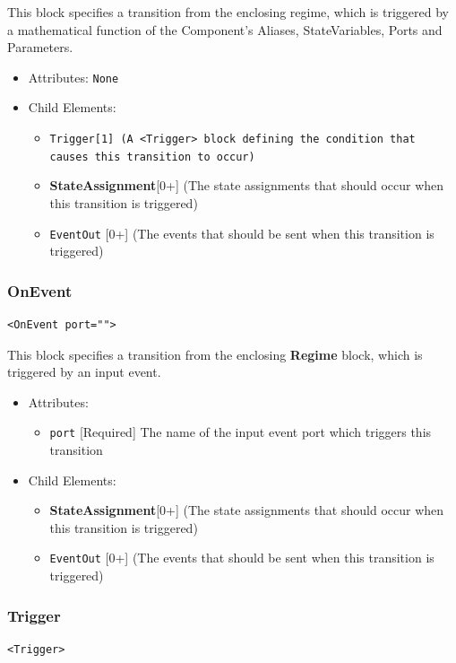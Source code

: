 \documentclass{article}
\newcommand{\StateAssignment}{{\bf{StateAssignment}}\xspace}
\newcommand{\Regime}{{\bf{Regime}}\xspace}
\newcommand{\Trigger}{\tt{Trigger}}
\begin{document}
This block specifies a transition from the enclosing regime, which is triggered
by a mathematical function of the Component's Aliases, StateVariables, Ports and
Parameters.

\begin{itemize}
\item Attributes: \texttt{None}

\item Child Elements:
%
\begin{itemize}
\item \Trigger {[}1{]} (A \verb|<Trigger>| block defining the condition that
causes this transition to occur)
\item \StateAssignment {[}0+{]} (The state assignments that should occur when
this transition is triggered)
\item {\tt EventOut} {[}0+{]} (The events that should be sent when this
transition is triggered)
\end{itemize}
\end{itemize}

\subsubsection{OnEvent}
%
\begin{lstlisting}
<OnEvent port="">
\end{lstlisting}

This block specifies a transition from the enclosing \Regime block, which is
triggered
by an input event.

\begin{itemize}
\item Attributes:
%
\begin{itemize}
\item \verb|port| {[}Required{]} The name of the input event port which triggers
this
transition
\end{itemize}

\item Child Elements:
%
\begin{itemize}
\item \StateAssignment {[}0+{]} (The state assignments that should occur when
this transition is triggered)
\item {\tt EventOut} {[}0+{]} (The events that should be sent when this
transition is triggered)
\end{itemize}
\end{itemize}

\subsubsection{Trigger}
%
\begin{lstlisting}
<Trigger>
\end{lstlisting}
\end{document}
